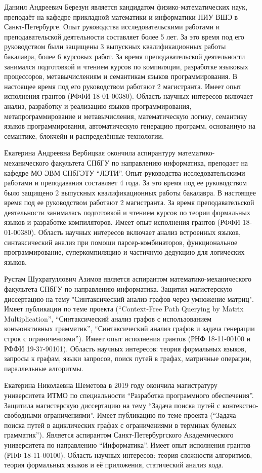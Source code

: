 \documentclass[12pt]{article}  %
\theoremstyle{remark}
\begin{document}
Даниил Андреевич Березун является кандидатом физико-математических наук, преподаёт на кафедре прикладной математики и информатики НИУ ВШЭ в Санкт-Петербурге.
Опыт руководства исследовательскими работами и преподавательской деятельности составляет более 5 лет.
За это время под его руководством были защищены 3 выпускных квалификационных работы бакалавра, более 6 курсовых работ.
За время преподавательской деятельности занимался подготовкой и чтением курсов по компиляции, разработке языковых процессоров, метавычислениям и семантикам языков программирования.
В настоящее время под его руководством работают 2 магистранта.
Имеет опыт исполнения грантов (РФФИ 18-01-00380).
Область научных интересов включает анализ, разработку и реализацию языков программирования,  метапрограммирование и метавычисления, математическую логику, семантику языков программирования,
автоматическую генерацию программ, основанную на семантике, блокчейн и распределённые технологии.

Екатерина Андреевна Вербицкая окончила аспирантуру математико-механического факультета СПбГУ по направлению информатика, преподает на кафедре МО ЭВМ СПбГЭТУ ``ЛЭТИ''.
Опыт руководства исследовательскими работами и преподавания составляет 4 года.
За это время под ее руководством было защищено 2 выпускных квалификационных работы бакалавра.
В настоящее время под ее руководством работают 2 магистранта.
За время преподавательской деятельности занималась подготовкой и чтением курсов по теории формальных языков и разработке компиляторов.
Имеет опыт исполнения грантов (РФФИ 18-01-00380).
Область научных интересов включает анализ встроенных языков, синтаксический анализ при помощи парсер-комбинаторов, функциональное программирование, суперкомпиляцию и частичную дедукцию для логических языков.

Рустам Шухратуллович Азимов является аспирантом математико-механического факультета СПбГУ по направлению информатика.
Защитил магистерскую диссертацию на тему "Синтаксический анализ графов через умножение матриц".
Имеет публикации по теме проекта (``Context-Free Path Querying by Matrix Multiplication'', ``Синтаксический анализ графов с использованием конъюнктивных грамматик'', ``Синтаксический анализ графов и задача генерации строк с ограничениями'').
Имеет опыт исполнения грантов (РНФ 18-11-00100 и РФФИ 19-37-90101).
Область научных интересов: теория формальных языков, запросы к графам, языки запросов, поиск путей в графах, матричные операции, параллельные алгоритмы.

Екатерина Николаевна Шеметова в 2019 году окончила магистратуру университета ИТМО по специальности ``Разработка программного обеспечения''.
Защитила магистерскую диссертацию на тему ``Задача поиска путей с контекстно-свободными ограничениями''.
Имеет публикацию по теме проекта (``Задача поиска путей в ациклических графах с ограничениями в терминах булевых грамматик'').
Является аспирантом Санкт-Петербургского Академического университета по направлению ``Информатика''. Имеет опыт исполнения грантов (РНФ 18-11-00100).
Область научных интересов: теория сложности алгоритмов, теория формальных языков и её приложения, статический анализ кода.
\end{document}
